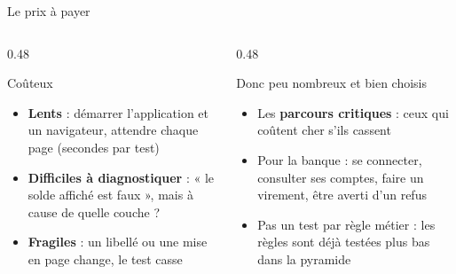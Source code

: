 \documentclass[aspectratio=169,10pt]{beamer}
\begin{document}
\begin{frame}{Le prix à payer}
  \begin{columns}[T]
    \begin{column}{0.48\textwidth}
      \begin{alertblock}{Coûteux}
        \begin{itemize}
          \item \textbf{Lents} : démarrer l'application et un navigateur, attendre chaque page (secondes par test)
          \item \textbf{Difficiles à diagnostiquer} : « le solde affiché est faux », mais à cause de quelle couche ?
          \item \textbf{Fragiles} : un libellé ou une mise en page change, le test casse
        \end{itemize}
      \end{alertblock}
    \end{column}
    \begin{column}{0.48\textwidth}
      \begin{exampleblock}{Donc peu nombreux et bien choisis}
        \begin{itemize}
          \item Les \textbf{parcours critiques} : ceux qui coûtent cher s'ils cassent
          \item Pour la banque : se connecter, consulter ses comptes, faire un virement, être averti d'un refus
          \item Pas un test par règle métier : les règles sont déjà testées plus bas dans la pyramide
        \end{itemize}
      \end{exampleblock}
    \end{column}
  \end{columns}
\end{frame}
\end{document}
